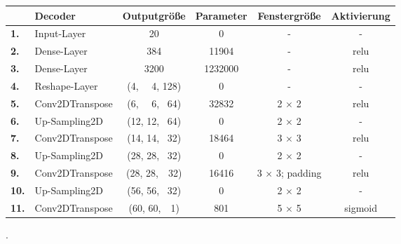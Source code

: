 \documentclass[12pt]{article}
\begin{document}
	\begin{table}[htb]
		\begin{center}
			\begin{tabular}{llcccc}\toprule
				\textbf{\ }	&\textbf{Decoder}	&\textbf{Outputgröße} &\textbf{Parameter} &\textbf{Fenstergröße} &\textbf{Aktivierung}\\
				\midrule
				\textbf{1.}	&Input-Layer	& 20				& 0		& - 			&- \\
				\textbf{2.}	&Dense-Layer 	& 384				& 11904 & -				&relu \\
				\textbf{3.}	&Dense-Layer	& 3200				& 1232000& -				&relu \\
				\textbf{4.}	&Reshape-Layer	& (4, \ \ 4,  128)	& 0		& -		&- \\
				\textbf{5.}	&Conv2DTranspose& (6, \ \ 6, \ 64)	& 32832	& 2 $\times$ 2 	&relu \\
				\textbf{6.}	&Up-Sampling2D	& (12, 12, \ 64)	& 0		& 2 $\times$ 2 	&- \\
				\textbf{7.}	&Conv2DTranspose& (14, 14, \ 32)	& 18464		& 3 $\times$ 3 			&relu \\
				\textbf{8.}	&Up-Sampling2D	& (28, 28, \ 32)	& 0	& 2 $\times$ 2 			&- \\
				\textbf{9.}	&Conv2DTranspose& (28, 28,\ \ 32)	& 16416  	& 3 $\times$ 3; padding 			&relu \\
				\textbf{10.}&Up-Sampling2D	& (56, 56, \ 32)	& 0	& 2 $\times$ 2 			&- \\
				\textbf{11.}&Conv2DTranspose& (60, 60,\ \ 1)	& 801  	& 5 $\times$ 5 &sigmoid \\
				\bottomrule
			\end{tabular}
		\end{center}
	\end{table}
	\newpage
	.
	\newpage
\end{document}
